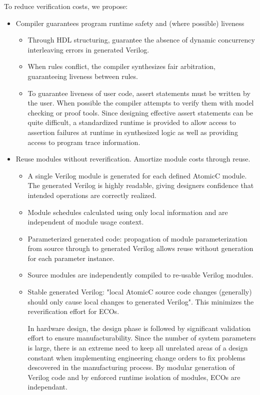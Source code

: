 To reduce verification costs, we propose:
\begin{itemize}
\item Compiler guarantees program runtime safety and (where possible) liveness
\begin{itemize}
\item Through HDL structuring, guarantee the absence of dynamic concurrency interleaving errors in generated Verilog.
\item When rules conflict, the compiler synthesizes fair arbitration, guaranteeing liveness between rules.
\item To guarantee liveness of user code, assert statements must be written by the user.
When possible the compiler attempts to verify them with model checking or proof tools.
Since designing effective assert statements can be quite difficult, a standardized runtime
is provided to allow access to assertion failures at runtime in synthesized logic as well
as providing access to program trace information.
\end{itemize}
\item Reuse modules without reverification.  Amortize module costs through reuse.
\begin{itemize}
\item A single Verilog module is generated for each defined AtomicC module.
The generated Verilog is highly readable, giving designers confidence that
intended operations are correctly realized.
\item Module schedules calculated using only local information and are independent of module usage context.
\item Parameterized generated code: propagation of module parameterization from
source through to generated Verilog allows reuse without generation for each parameter instance.
\item Source modules are independently compiled to re-usable Verilog modules.
\item Stable generated Verilog: "local AtomicC source code changes (generally) should only cause local changes to generated Verilog".
This minimizes the reverification effort for ECOs.

In hardware design, the design phase is followed by significant validation effort
to ensure manufacturability.  Since the number of system parameters is
large, there is an extreme need to keep all unrelated areas of a design constant
when implementing engineering change orders to fix problems descovered
in the manufacturing process.
By modular generation of Verilog code and by enforced runtime isolation
of modules, ECOs are independant.


\end{itemize}
\end{itemize}
